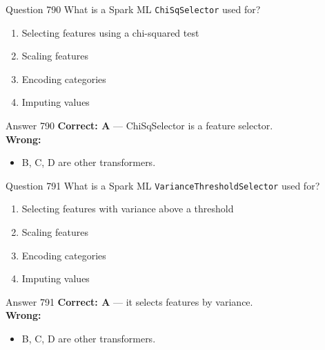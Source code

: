 \documentclass[aspectratio=169,11pt]{beamer}
\begin{document}
	\begin{frame}{Question 790}
		What is a Spark ML \texttt{ChiSqSelector} used for?
		\begin{enumerate}[label=\Alph*.]
			\item Selecting features using a chi-squared test
			\item Scaling features
			\item Encoding categories
			\item Imputing values
		\end{enumerate}
	\end{frame}
	\begin{frame}{Answer 790}
		\textbf{Correct: A} --- ChiSqSelector is a feature selector.\\
		\vspace{0.5em}
		\textbf{Wrong:}
		\begin{itemize}
			\item B, C, D are other transformers.
		\end{itemize}
	\end{frame}
	
	\begin{frame}{Question 791}
		What is a Spark ML \texttt{VarianceThresholdSelector} used for?
		\begin{enumerate}[label=\Alph*.]
			\item Selecting features with variance above a threshold
			\item Scaling features
			\item Encoding categories
			\item Imputing values
		\end{enumerate}
	\end{frame}
	\begin{frame}{Answer 791}
		\textbf{Correct: A} --- it selects features by variance.\\
		\vspace{0.5em}
		\textbf{Wrong:}
		\begin{itemize}
			\item B, C, D are other transformers.
		\end{itemize}
	\end{frame}
	
\end{document}
